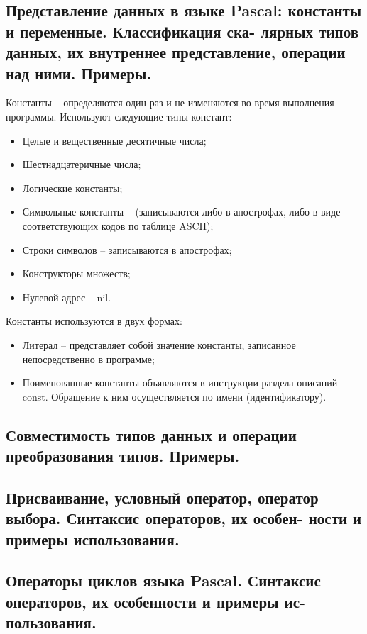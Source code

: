 \subsection{Представление  данных  в  языке  Pascal:  константы  и  переменные.  Классификация  ска-
лярных типов данных, их внутреннее представление, операции над ними. Примеры.} 

Константы – определяются один раз и не изменяются во время выполнения программы.
Используют следующие типы констант:
\begin{itemize}
    \item Целые и вещественные десятичные числа;
    \item Шестнадцатеричные числа;
    \item Логические константы;
    \item Символьные константы – (записываются либо в апострофах, либо в виде соответствующих кодов по таблице ASCII);
    \item Строки символов – записываются в апострофах;
    \item Конструкторы множеств;
    \item Нулевой адрес – nil.
\end{itemize}
Константы используются в двух формах: 
\begin{itemize}
    \item Литерал – представляет собой значение константы, записанное непосредственно в программе;
    \item Поименованные константы объявляются в инструкции раздела описаний const. Обращение к ним осуществляется по имени (идентификатору).
\end{itemize}

\subsection{Совместимость типов данных и операции преобразования типов. Примеры. }



\subsection{Присваивание, условный оператор, оператор выбора. Синтаксис операторов, их особен-
ности и примеры использования. }



\subsection{Операторы циклов языка Pascal. Синтаксис операторов, их особенности и примеры ис-
пользования. }



